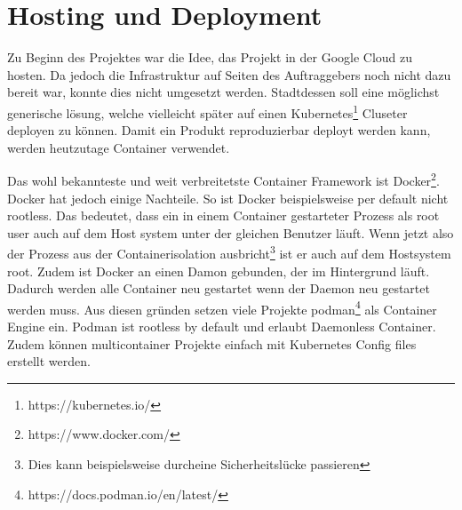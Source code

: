 \section{Hosting und Deployment}
\label{state:deployment}

Zu Beginn des Projektes war die Idee, das Projekt in der Google Cloud zu hosten.
Da jedoch die Infrastruktur auf Seiten des Auftraggebers noch nicht dazu bereit
war, konnte dies nicht umgesetzt werden. Stadtdessen soll eine möglichst
generische lösung, welche vielleicht später auf einen Kubernetes\footnote{https://kubernetes.io/}
Cluseter deployen zu können. Damit ein Produkt reproduzierbar
deployt werden kann, werden heutzutage Container verwendet. \cite{what-is-a-container}

Das wohl bekannteste und weit verbreitetste Container Framework
ist Docker\footnote{https://www.docker.com/}. Docker hat jedoch einige Nachteile.
So ist Docker beispielsweise per default nicht rootless.\cite{docker:rootless}
Das bedeutet, dass ein in einem Container gestarteter Prozess als root user
auch auf dem Host system unter der gleichen Benutzer läuft. Wenn jetzt also
der Prozess aus der Containerisolation ausbricht\footnote{Dies kann beispielsweise durcheine Sicherheitslücke passieren}
ist er auch auf dem Hostsystem root.\cite{so_2020}
Zudem ist Docker an einen Damon gebunden, der im Hintergrund läuft.
Dadurch werden alle Container neu gestartet wenn der Daemon neu gestartet werden muss.\cite{docker:daemon}
Aus diesen gründen setzen viele Projekte podman\footnote{https://docs.podman.io/en/latest/}
als Container Engine ein. Podman ist rootless by default und erlaubt Daemonless Container.
Zudem können multicontainer Projekte einfach mit Kubernetes Config files
erstellt werden.\cite{redhat:podman-pods}